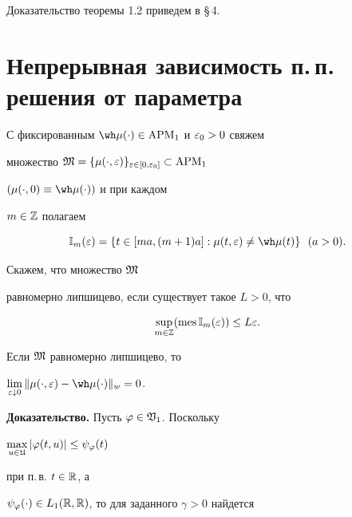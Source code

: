 Доказательство теоремы 1.2 приведем в \S\,4.





\section{Непрерывная зависимость п.\,п. решения от параметра}





С фиксированным $\wh\mu(\cdot)\in \APM_{1}$ и $\varepsilon_{0}>0$ свяжем


множество $\frak M=\{\mu(\cdot,\varepsilon)\}_{\varepsilon\in[0,\varepsilon_{0}]}\subset \operatorname{APM}_{1}$


$(\mu(\cdot,0)\equiv\wh\mu(\cdot))$ и при каждом


$m\in\Bbb Z$ полагаем


\begin{equation}


\Bbb I_{m}(\ve)=\{t\in[ma,(m+1)a]:\mu(t,\ve)\ne\wh\mu(t)\}


\ \ (a>0).


\end{equation}


Скажем, что множество $\frak M$


равномерно липшицево, если существует такое $L>0$, что


\begin{equation}


\sup_{m\in\Bbb Z}(\mes\Bbb I_{m}(\ve))\le L\ve.


\end{equation}





\begin{lems}


Если $\frak M$ равномерно липшицево, то


$\lim\lt_{\ve\downarrow0}\|\mu(\cdot,\ve)-\wh\mu(\cdot)\|_{w}=0$.


\end{lems}





{\bf Доказательство.} Пусть $\varphi\in\frak V_{1}$. Поскольку


$\max\limits_{u\in\frak U}|\varphi(t,u)|\le\psi_{\varphi}(t)$


при п.\,в. $t\in\Bbb R$, а


$\psi_{\varphi}(\cdot)\in L_{1}(\Bbb R,\Bbb R)$, то для заданного $\gamma>0$ найдется


